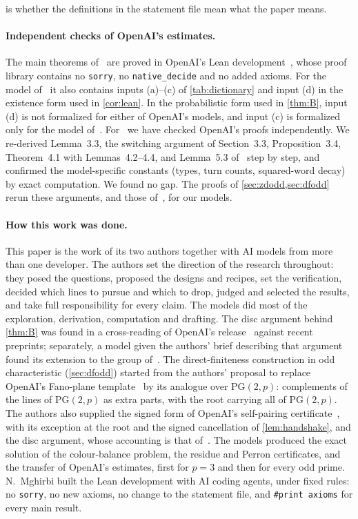 \documentclass[11pt]{article}
\theoremstyle{definition}
\theoremstyle{plain}
\newcommand{\PG}{\mathrm{PG}}
\newcommand{\lean}[1]{\texttt{\small #1}}
\begin{document}
is whether the definitions in the statement file mean what the paper means.

\paragraph{Independent checks of OpenAI's estimates.} The main theorems of~\cite{OAI196,OAI197b,OAI197d,OAI252,OAI257} are proved in OpenAI's Lean development~\cite{OAIlean}, whose proof library contains no \lean{sorry}, no \lean{native\_decide} and no added axioms. For the model of~\cite{OAI196} it also contains inputs (a)--(c) of \cref{tab:dictionary} and input (d) in the existence form used in \cref{cor:lean}. In the probabilistic form used in \cref{thm:B}, input (d) is not formalized for either of OpenAI's models, and input (c) is formalized only for the model of~\cite{OAI196}. For~\cite{OAI197a} we have checked OpenAI's proofs independently. We re-derived Lemma~3.3, the switching argument of Section~3.3, Proposition~3.4, Theorem~4.1 with Lemmas~4.2--4.4, and Lemma~5.3 of~\cite{OAI197a} step by step, and confirmed the model-specific constants (types, turn counts, squared-word decay) by exact computation. We found no gap. The proofs of \cref{sec:zdodd,sec:dfodd} rerun these arguments, and those of~\cite{OAI196}, for our models.

\paragraph{How this work was done.} This paper is the work of its two authors together with AI models from more than one developer. The authors set the direction of the research throughout: they posed the questions, proposed the designs and recipes, set the verification, decided which lines to pursue and which to drop, judged and selected the results, and take full responsibility for every claim. The models did most of the exploration, derivation, computation and drafting. The disc argument behind \cref{thm:B} was found in a cross-reading of OpenAI's release~\cite{OAIcatalog} against recent preprints; separately, a model given the authors' brief describing that argument found its extension to the group of~\cite{OAI197a}. The direct-finiteness construction in odd characteristic (\cref{sec:dfodd}) started from the authors' proposal to replace OpenAI's Fano-plane template~\cite[\S3.1]{OAI197a} by its analogue over $\PG(2,p)$: complements of the lines of $\PG(2,p)$ as extra parts, with the root carrying all of $\PG(2,p)$. The authors also supplied the signed form of OpenAI's self-pairing certificate~\cite[Prop.~2.1]{OAI197a}, with its exception at the root and the signed cancellation of \cref{lem:handshake}, and the disc argument, whose accounting is that of~\cite[Thm.~3.1]{OAI257}. The models produced the exact solution of the colour-balance problem, the residue and Perron certificates, and the transfer of OpenAI's estimates, first for $p=3$ and then for every odd prime. N.~Mghirbi built the Lean development with AI coding agents, under fixed rules: no \lean{sorry}, no new axioms, no change to the statement file, and \lean{\#print axioms} for every main result.
\end{document}
